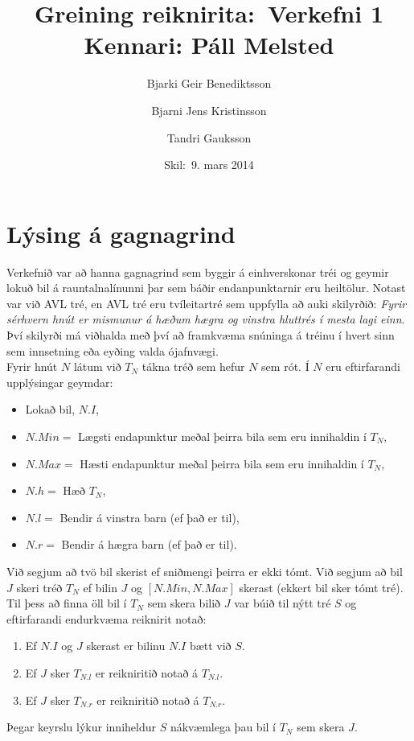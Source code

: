 \documentclass[a4paper,oneside]{article}
\title{
    Greining reiknirita:\ Verkefni 1
    \\\small{Kennari: Páll Melsted}
}
\author{Bjarki Geir Benediktsson \and  Bjarni Jens Kristinsson \and Tandri Gauksson}
\date{\small{Skil:\ 9. mars 2014}}
\begin{document}
\maketitle

\section{Lýsing á gagnagrind}

Verkefnið var að hanna gagnagrind sem byggir á einhverskonar tréi og geymir lokuð bil á rauntalnalínunni þar sem báðir endanpunktarnir eru heiltölur.
Notast var við AVL tré, en AVL tré eru tvíleitartré sem uppfylla að auki skilyrðið: \textit{Fyrir sérhvern hnút er mismunur á hæðum hægra og vinstra hluttrés í mesta lagi einn}.
Því skilyrði má viðhalda með því að framkvæma snúninga á tréinu í hvert sinn sem innsetning eða eyðing valda ójafnvægi.\\

\noindent
Fyrir hnút $N$ látum við $T_N$ tákna tréð sem hefur $N$ sem rót. Í $N$ eru eftirfarandi upplýsingar geymdar:
\begin{itemize}
    \item Lokað bil, $N.I$,
    \item $N.Min =$ Lægsti endapunktur meðal þeirra bila sem eru innihaldin í $T_N$,
    \item $N.Max =$ Hæsti endapunktur meðal þeirra bila sem eru innihaldin í $T_N$,
    \item $N.h = $ Hæð $T_N$,
    \item $N.l = $ Bendir á vinstra barn (ef það er til),
    \item $N.r = $ Bendir á hægra barn (ef það er til).
\end{itemize}

\noindent
Við segjum að tvö bil skerist ef sniðmengi þeirra er ekki tómt.
Við segjum að bil $J$ skeri tréð $T_N$ ef bilin $J$ og $[N.Min, N.Max]$ skerast (ekkert bil sker tómt tré).
Til þess að finna öll bil í $T_N$ sem skera bilið $J$ var búið til nýtt tré $S$ og eftirfarandi endurkvæma reiknirit notað:
\begin{enumerate}
    \item Ef $N.I$ og $J$ skerast er bilinu $N.I$ bætt við $S$.
    \item Ef $J$ sker $T_{N.l}$ er reikniritið notað á $T_{N.l}$.
    \item Ef $J$ sker $T_{N.r}$ er reikniritið notað á $T_{N.r}$.
\end{enumerate}
Þegar keyrslu lýkur inniheldur $S$ nákvæmlega þau bil í $T_N$ sem skera $J$.\\
\end{document}
